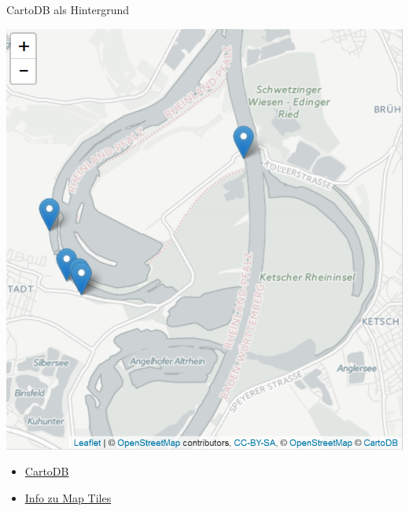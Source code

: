 \documentclass[ignorenonframetext,]{beamer}
\newenvironment{Shaded}{\begin{snugshade}}{\end{snugshade}}
\newcommand{\KeywordTok}[1]{\textcolor[rgb]{0.13,0.29,0.53}{\textbf{#1}}}
\newcommand{\NormalTok}[1]{#1}
\newcommand{\OperatorTok}[1]{\textcolor[rgb]{0.81,0.36,0.00}{\textbf{#1}}}
\newcommand{\StringTok}[1]{\textcolor[rgb]{0.31,0.60,0.02}{#1}}
\begin{document}
\begin{frame}[fragile]{CartoDB als Hintergrund}
\protect\hypertarget{cartodb-als-hintergrund}{}

\begin{Shaded}
\end{Shaded}

\includegraphics{figure/CartoDBInteractive.PNG}

\begin{itemize}
\item
  \href{https://carto.com/attribution}{CartoDB}
\item
  \href{https://www.mapbox.com/help/how-web-maps-work/}{Info zu Map
  Tiles}
\end{itemize}

\end{frame}
\end{document}
